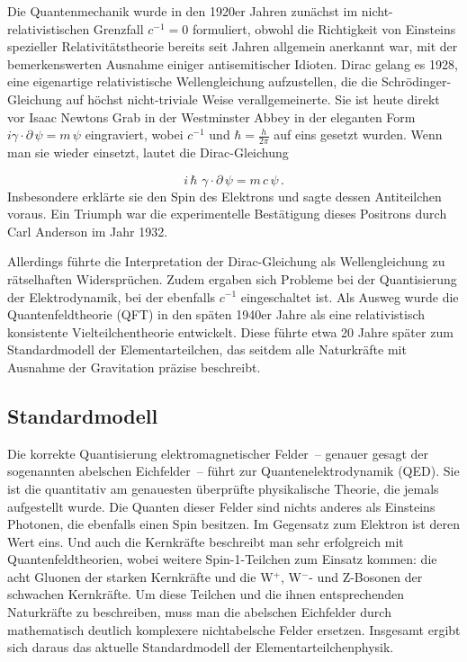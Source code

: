 \documentclass{scrartcl}
\begin{document}
\newpage {}
\label{sec:0110}

Die Quantenmechanik wurde in den 1920er Jahren zunächst im nicht-relativistischen Grenzfall $c^{−1}=0$ formuliert, obwohl die Richtigkeit von Einsteins spezieller Relativitätstheorie bereits seit Jahren allgemein anerkannt war, mit der bemerkenswerten Ausnahme einiger antisemitischer Idioten. Dirac gelang es 1928, eine eigenartige relativistische Wellengleichung aufzustellen, die die Schrödinger-Gleichung auf höchst nicht-triviale Weise verallgemeinerte. Sie ist heute direkt vor Isaac Newtons Grab in der Westminster Abbey in der eleganten Form $i \gamma \cdot \partial\, \psi = m\, \psi$ eingraviert, wobei $c^{−1}$ und $\hbar=\frac{h}{2 \pi}$ auf eins gesetzt wurden. Wenn man sie wieder einsetzt, lautet die Dirac-Gleichung

\begin{equation*}
  i\, \hbar\,\, \gamma \cdot \partial\, \psi = m\,c\, \psi\,.
\end{equation*}
%
Insbesondere erklärte sie den Spin des Elektrons und sagte dessen Antiteilchen voraus. Ein Triumph war die experimentelle Bestätigung dieses Positrons durch Carl Anderson im Jahr 1932.

Allerdings führte die Interpretation der Dirac-Gleichung als Wellengleichung zu rätselhaften Widersprüchen. Zudem ergaben sich Probleme bei der Quantisierung der Elektrodynamik, bei der ebenfalls $c^{-1}$ eingeschaltet ist. Als Ausweg wurde die Quantenfeldtheorie (QFT) in den späten 1940er Jahre als eine relativistisch konsistente Vielteilchentheorie entwickelt. Diese führte etwa 20 Jahre später zum Standardmodell der Elementarteilchen, das seitdem alle Naturkräfte mit Ausnahme der Gravitation präzise beschreibt.


\subsection*{Standardmodell}

Die korrekte Quantisierung elektromagnetischer Felder~-- genauer gesagt der sogenannten abelschen Eichfelder~-- führt zur Quantenelektrodynamik (QED). Sie ist die quantitativ am genauesten überprüfte physikalische Theorie, die jemals aufgestellt wurde. Die Quanten dieser Felder sind nichts anderes als Einsteins Photonen, die ebenfalls einen Spin besitzen. Im Gegensatz zum Elektron ist deren Wert eins. Und auch die Kernkräfte beschreibt man sehr erfolgreich mit Quantenfeldtheorien, wobei weitere Spin-1-Teilchen zum Einsatz kommen: die acht Gluonen der starken Kernkräfte und die W$^+$, W$^-$- und Z-Bosonen der schwachen Kernkräfte. Um diese Teilchen und die ihnen entsprechenden Naturkräfte zu beschreiben, muss man die abelschen Eichfelder durch mathematisch deutlich komplexere nichtabelsche Felder ersetzen. Insgesamt ergibt sich daraus das aktuelle Standardmodell der Elementarteilchenphysik.
\end{document}
